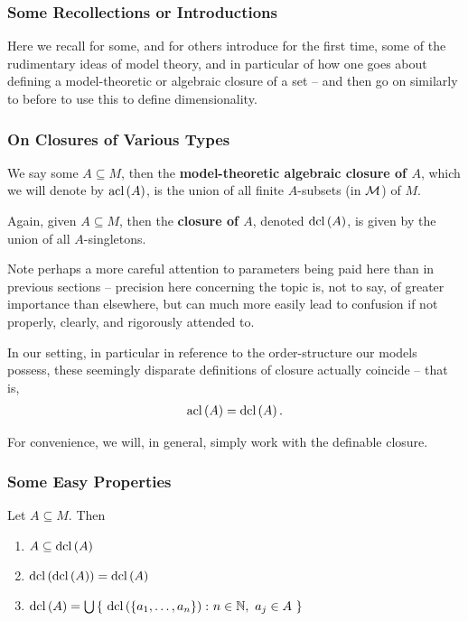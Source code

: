 \subsubsection{Some Recollections or Introductions}

Here we recall for some, and for others introduce for the first time, some of the rudimentary ideas of model theory, and in particular of how one goes about defining a model-theoretic or algebraic closure of a set -- and then go on similarly to before to use this to define dimensionality.

\subsubsection{On Closures of Various Types}

\begin{definition}
  We say some $A \subseteq M$, then the \textbf{model-theoretic algebraic closure of $A$}, which we will denote by $\operatorname{acl}\left(A\right)$, is the union of all finite $A$- subsets (in $\mathcal{M}$) of $M$.
\end{definition}

\begin{definition}
  Again, given $A \subseteq M$, then the \textbf{ closure of $A$}, denoted $\operatorname{dcl}\left(A\right)$, is given by the union of all $A$- singletons.
\end{definition}

Note perhaps a more careful attention to parameters being paid here than in previous sections -- precision here concerning the topic is, not to say, of greater importance than elsewhere, but can much more easily lead to confusion if not properly, clearly, and rigorously attended to.


In our setting, in particular in reference to the order-structure our models possess, these seemingly disparate definitions of closure actually coincide -- that is,
\begin{align*}
  \operatorname{acl}\left(A\right) = \operatorname{dcl}\left(A\right).
\end{align*}

For convenience, we will, in general, simply work with the definable closure.

\pagebreak

\subsubsection{Some Easy Properties}

\begin{proposition}
\leavevmode
Let $A \subseteq M$. Then
  \begin{enumerate}
    \item $A \subseteq \operatorname{dcl}\left(A\right)$
    \item $\operatorname{dcl}\left(\operatorname{dcl}\left(A\right)\right) = \operatorname{dcl}\left(A\right)$
    \item $\dcl{A} = \bigcup \left\{ \ \dcl{\{a_1, \hdots, a_n\}} \colon n \in \N, \ a_j \in A \ \right\}$
  \end{enumerate}
\end{proposition}

